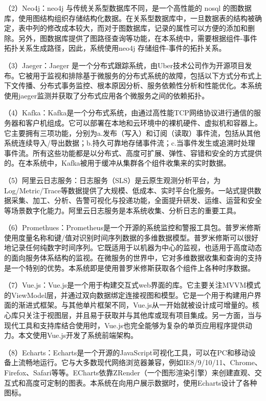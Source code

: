 （2）Neo4j：neo4j 与传统关系型数据库不同，是一个高性能的 nosql 的图数据库，使用图结构组织存储结构化数据。在关系型数据库中，一旦数据表的结构被确定，表中列的修改成本较大，而对于图数据库，记录的属性可以方便的添加和删除。另外，图数据库提供了图路径查询等功能，在本系统中，需要根据组件-事件拓扑关系生成路径，因此，系统使用neo4j 存储组件-事件的拓扑关系。

（3）Jaeger：Jaeger 是一个分布式跟踪系统，由Uber技术公司作为开源项目发布。它被用于监视和排除基于微服务的分布式系统的故障，包括以下方式分布式上下文传播、分布式事务监控、根本原因分析、服务依赖性分析和性能优化。本系统使用jaeger监测并获取了分布式应用各个微服务之间的依赖拓扑。

（4）Kafka：Kafka是一个分布式系统，由通过高性能TCP网络协议进行通信的服务器和客户机组成。它可以部署在本地和云环境中的裸机硬件、虚拟机和容器上。它主要拥有三项功能，分别为a.发布（写入）和订阅（读取）事件流，包括从其他系统连续导入/导出数据；b.持久可靠地存储事件流；c.当事件发生或追溯时处理事件流。所有这些功能都是以分布式、高度可扩展、弹性、容错和安全的方式提供的。在本系统中，Kafka被用于缓冲从集群各个组件收集来的实时数据。

（5）阿里云日志服务：日志服务（SLS）是云原生观测分析平台，为Log/Metric/Trace等数据提供了大规模、低成本、实时平台化服务。一站式提供数据采集、加工、分析、告警可视化与投递功能，全面提升研发、运维、运营和安全等场景数字化能力。阿里云日志服务是本系统收集、分析日志的重要工具。

（6）Promethues：Prometheus是一个开源的系统监控和警报工具包。普罗米修斯使用度量名称和键/值对识别时间序列数据的多维数据模型。普罗米修斯可以很好地记录任何纯数字时间序列。它既适用于以机器为中心的监视，也适用于高度动态的面向服务体系结构的监视。在微服务的世界中，它对多维数据收集和查询的支持是一个特别的优势。本系统即是使用普罗米修斯获取各个组件上各种时序数据。

（7）Vue.js：Vue.js是一个用于构建交互式web界面的库。它主要关注MVVM模式的ViewModel层，并通过双向数据绑定连接视图和模型。它是一个用于构建用户界面的渐进式框架。与其他单片框架不同，Vue.js从一开始就被设计成可增量的。核心库只关注于视图层，并且易于获取并与其他库或现有项目集成。另一方面，当与现代工具和支持库结合使用时，Vue.js也完全能够为复杂的单页应用程序提供动力。本文使用Vue.js开发了系统前端架构。

（8）Echarts：Echarts是一个开源的JavaScript可视化工具，可以在PC和移动设备上流畅地运行。它与大多数现代网络浏览器兼容，例如IE8/9/10/11、Chrome、Firefox、Safari等等。ECharts依靠ZRender（一个图形渲染引擎）来创建直观、交互式和高度可定制的图表。本系统在向用户展示数据时，使用Echarts设计了各种图标。


